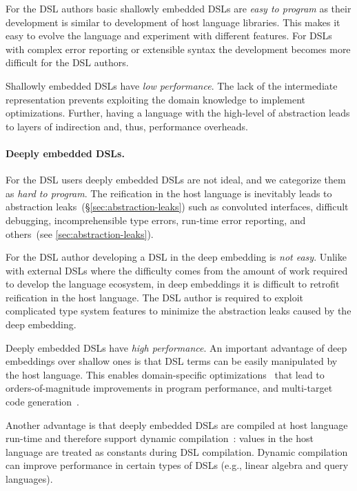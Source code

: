 For the DSL authors basic shallowly embedded DSLs are \emph{easy to program} as their
 development is similar to development of host language libraries. This makes it easy
 to evolve the language and experiment with different features. For DSLs
 with complex error reporting or extensible syntax the development
 becomes more difficult for the DSL authors.

Shallowly embedded DSLs have \emph{low performance}. The lack of the intermediate representation
prevents exploiting the domain knowledge to implement optimizations. Further, having
a language with the high-level of abstraction leads to layers of indirection and, thus,
performance overheads.

\paragraph{Deeply embedded DSLs.} For the DSL users deeply embedded DSLs are not ideal,
 and we categorize them as \emph{hard to program}. The reification in the host language
 is inevitably leads to abstraction leaks~(\S \ref{sec:abstraction-leaks}) such as
 convoluted interfaces, difficult debugging, incomprehensible type errors, run-time error reporting,
 and others~(see \ref{sec:abstraction-leaks}).

For the DSL author developing a DSL in the deep embedding is \emph{not easy}. Unlike with
 external DSLs where the difficulty comes from the amount of work required to develop
 the language ecosystem, in deep embeddings it is difficult to retrofit reification in the host language.
 The DSL author is required to exploit complicated type system features to
 minimize the abstraction leaks caused by the deep embedding.

Deeply embedded DSLs have \emph{high performance}. An important advantage of deep embeddings over shallow ones is that DSL
  terms can be easily manipulated by the host language. This enables domain-specific
  optimizations~\cite{rompf2012lightweight,rompf_optimizing_2013}
  that lead to orders-of-magnitude improvements in program performance, and
  multi-target code generation~\cite{brown_heterogeneous_2011}.

Another advantage is that deeply embedded DSLs are compiled at host language run-time and therefore
 support dynamic compilation~\cite{auslander1996fast,grant2000dyc}: values in the host language are treated as constants during DSL compilation. Dynamic compilation can improve performance in certain types of DSLs (e.g., linear algebra and query languages).


